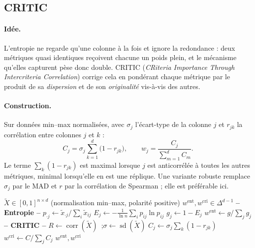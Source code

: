 \documentclass[11pt,a4paper]{article}
\theoremstyle{definition}
\theoremstyle{remark}
\newcommand{\simplex}{\Delta^{d-1}}
\begin{document}
\bigskip

\subsection{CRITIC}
\label{sec:critic}

\medskip

\paragraph{Idée.} L'entropie ne regarde qu'une colonne à la fois et ignore la redondance : deux
métriques quasi identiques reçoivent chacune un poids plein, et le mécanisme qu'elles capturent
pèse donc double. CRITIC (\emph{CRiteria Importance Through Intercriteria Correlation}) corrige
cela en pondérant chaque métrique par le produit de sa \emph{dispersion} et de son
\emph{originalité} vis-à-vis des autres.

\medskip

\paragraph{Construction.} Sur données min--max normalisées, avec $\sigma_j$ l'écart-type de la
colonne $j$ et $r_{jk}$ la corrélation entre colonnes $j$ et $k$ :
\[
C_j = \sigma_j \sum_{k=1}^{d} \big(1 - r_{jk}\big),
\qquad
w_j = \frac{C_j}{\sum_{m=1}^d C_m}.
\]
Le terme $\sum_k (1 - r_{jk})$ est maximal lorsque $j$ est anticorrélée à toutes les autres
métriques, minimal lorsqu'elle en est une réplique. Une variante robuste remplace $\sigma_j$ par
le MAD et $r$ par la corrélation de Spearman ; elle est préférable ici.

\medskip

\begin{algorithm}[htbp]
  \caption{Poids par entropie et par CRITIC}
  \label{algo:poids}
  \begin{algorithmic}[1]
    \Require $\tilde{X}\in[0,1]^{n\times d}$ (normalisation min--max, polarité positive)
    \Ensure $w^{\mathrm{ent}}, w^{\mathrm{cri}} \in \simplex$
    \Statex \textbf{-- Entropie --}
      \State $p_{\cdot j} \gets \tilde{x}_{\cdot j} / \sum_i \tilde{x}_{ij}$
      \State $E_j \gets -\frac{1}{\ln n}\sum_i p_{ij}\ln p_{ij}$ 
      \State $g_j \gets 1 - E_j$
    \EndFor
    \State $w^{\mathrm{ent}} \gets g / \sum_j g_j$
    \Statex \textbf{-- CRITIC --}
    \State $R \gets \operatorname{corr}(\tilde{X})$~;\quad $\sigma \gets \operatorname{sd}(\tilde{X})$
      \State $C_j \gets \sigma_j \sum_{k} (1 - r_{jk})$
    \EndFor
    \State $w^{\mathrm{cri}} \gets C / \sum_j C_j$
    \State \Return $w^{\mathrm{ent}}, w^{\mathrm{cri}}$
  \end{algorithmic}
\end{algorithm}
\end{document}
